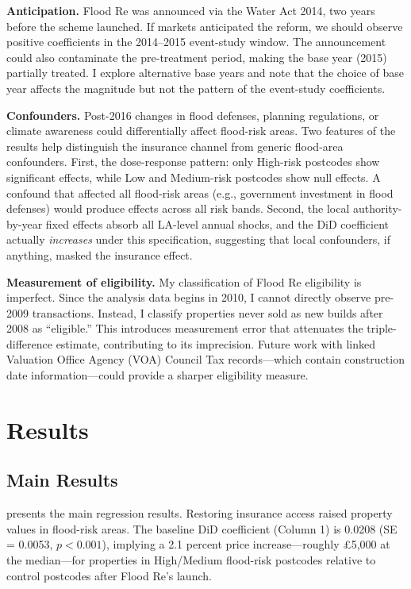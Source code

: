 \documentclass[12pt]{article}
\begin{document}
\textbf{Anticipation.} Flood Re was announced via the Water Act 2014, two years before the scheme launched. If markets anticipated the reform, we should observe positive coefficients in the 2014--2015 event-study window. The announcement could also contaminate the pre-treatment period, making the base year (2015) partially treated. I explore alternative base years and note that the choice of base year affects the magnitude but not the pattern of the event-study coefficients.

\textbf{Confounders.} Post-2016 changes in flood defenses, planning regulations, or climate awareness could differentially affect flood-risk areas. Two features of the results help distinguish the insurance channel from generic flood-area confounders. First, the dose-response pattern: only High-risk postcodes show significant effects, while Low and Medium-risk postcodes show null effects. A confound that affected all flood-risk areas (e.g., government investment in flood defenses) would produce effects across all risk bands. Second, the local authority-by-year fixed effects absorb all LA-level annual shocks, and the DiD coefficient actually \textit{increases} under this specification, suggesting that local confounders, if anything, masked the insurance effect.

\textbf{Measurement of eligibility.} My classification of Flood Re eligibility is imperfect. Since the analysis data begins in 2010, I cannot directly observe pre-2009 transactions. Instead, I classify properties never sold as new builds after 2008 as ``eligible.'' This introduces measurement error that attenuates the triple-difference estimate, contributing to its imprecision. Future work with linked Valuation Office Agency (VOA) Council Tax records---which contain construction date information---could provide a sharper eligibility measure.


\section{Results} \label{sec:results}

\subsection{Main Results}



 presents the main regression results. Restoring insurance access raised property values in flood-risk areas. The baseline DiD coefficient (Column 1) is 0.0208 (SE = 0.0053, $p < 0.001$), implying a 2.1 percent price increase---roughly \pounds5,000 at the median---for properties in High/Medium flood-risk postcodes relative to control postcodes after Flood Re's launch.
\end{document}

